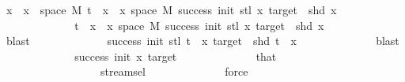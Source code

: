 \begin{isabellebody}
\ {\isachardoublequoteopen}x\ {\isasymin}\ {\isacharbraceleft}{\kern0pt}x\ {\isasymin}\ space\ M{\isachardot}{\kern0pt}\ {\isacharparenleft}{\kern0pt}t\ {\isacharhash}{\kern0pt}{\isacharhash}{\kern0pt}\ x{\isacharparenright}{\kern0pt}\ {\isasymin}\ {\isacharbraceleft}{\kern0pt}x{\isasymin}\ space\ M{\isachardot}{\kern0pt}\ success\ {\isacharparenleft}{\kern0pt}init{\isacharplus}{\kern0pt}{}{\isacharparenright}{\kern0pt}\ {\isacharparenleft}{\kern0pt}stl\ x{\isacharparenright}{\kern0pt}\ target\ {\isasymand}\ shd\ x{\isacharbraceright}{\kern0pt}{\isacharbraceright}{\kern0pt}\ {\isachardoublequoteclose}\isanewline
\ \ \ \ \ \ \ \ \ \ \isamarkupfalse%
\ \isamarkupfalse%
\ {\isachardoublequoteopen}{\isacharparenleft}{\kern0pt}t\ {\isacharhash}{\kern0pt}{\isacharhash}{\kern0pt}\ x{\isacharparenright}{\kern0pt}\ {\isasymin}\ {\isacharbraceleft}{\kern0pt}x{\isasymin}\ space\ M{\isachardot}{\kern0pt}\ success\ {\isacharparenleft}{\kern0pt}init{\isacharplus}{\kern0pt}{}{\isacharparenright}{\kern0pt}\ {\isacharparenleft}{\kern0pt}stl\ x{\isacharparenright}{\kern0pt}\ target\ {\isasymand}\ shd\ x{\isacharbraceright}{\kern0pt}{\isachardoublequoteclose}\isanewline
\ \ \ \ \ \ \ \ \ \ \ \ \isamarkupfalse%
\ blast\isanewline
\ \ \ \ \ \ \ \ \ \ \isamarkupfalse%
\ \isamarkupfalse%
\ {\isachardoublequoteopen}success\ {\isacharparenleft}{\kern0pt}init{\isacharplus}{\kern0pt}{}{\isacharparenright}{\kern0pt}\ {\isacharparenleft}{\kern0pt}stl\ {\isacharparenleft}{\kern0pt}t\ {\isacharhash}{\kern0pt}{\isacharhash}{\kern0pt}\ x{\isacharparenright}{\kern0pt}{\isacharparenright}{\kern0pt}\ target\ {\isasymand}\ shd\ {\isacharparenleft}{\kern0pt}t\ {\isacharhash}{\kern0pt}{\isacharhash}{\kern0pt}\ x{\isacharparenright}{\kern0pt}{\isachardoublequoteclose}\isanewline
\ \ \ \ \ \ \ \ \ \ \ \ \isamarkupfalse%
\ blast\isanewline
\ \ \ \ \ \ \ \ \ \ \isamarkupfalse%
\ \isamarkupfalse%
\ {\isachardoublequoteopen}success\ {\isacharparenleft}{\kern0pt}init{\isacharplus}{\kern0pt}{}{\isacharparenright}{\kern0pt}\ {\isacharparenleft}{\kern0pt}x{\isacharparenright}{\kern0pt}\ target{\isachardoublequoteclose}\isanewline
\ \ \ \ \ \ \ \ \ \ \ \ \isamarkupfalse%
\ that\isanewline
\ \ \ \ \ \ \ \ \ \ \ \ \ \ \ \ \ \ stream{\isachardot}{\kern0pt}sel{\isacharparenleft}{\kern0pt}{}{\isacharparenright}{\kern0pt}\isanewline
\ \ \ \ \ \ \ \ \ \ \ \ \isamarkupfalse%
\ force\isanewline

\end{isabellebody}
